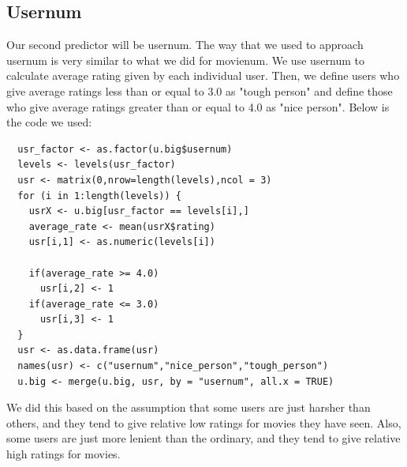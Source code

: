 \documentclass[11pt]{article}
\begin{document}
\subsection{Usernum}
Our second predictor will be usernum. The way that we used to 
approach usernum is very similar to what we did for movienum. We 
use usernum to calculate average rating given by each individual 
user. Then, we define users who give average ratings less than or 
equal to 3.0 as "tough person" and define those who give average 
ratings greater than or equal to 4.0 as "nice person". Below is the 
code we used:
\begin{verbatim}
  usr_factor <- as.factor(u.big$usernum)
  levels <- levels(usr_factor)
  usr <- matrix(0,nrow=length(levels),ncol = 3)
  for (i in 1:length(levels)) {
    usrX <- u.big[usr_factor == levels[i],]
    average_rate <- mean(usrX$rating)
    usr[i,1] <- as.numeric(levels[i])
    
    if(average_rate >= 4.0)
      usr[i,2] <- 1
    if(average_rate <= 3.0)
      usr[i,3] <- 1
  }
  usr <- as.data.frame(usr)
  names(usr) <- c("usernum","nice_person","tough_person")
  u.big <- merge(u.big, usr, by = "usernum", all.x = TRUE)
\end{verbatim}

We did this based on the assumption that some users are just 
harsher than others, and they tend to give relative low ratings for 
movies they have seen. Also, some users are just more lenient than 
the ordinary, and they tend to give relative high ratings for 
movies.
\end{document}
